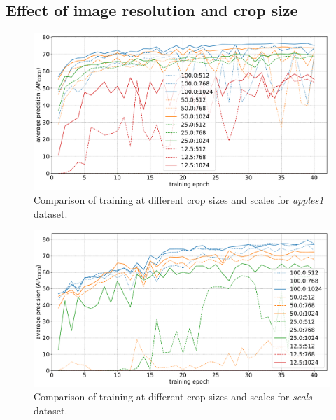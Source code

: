 \subsection {Effect of image resolution and crop size}
\label{sec:scale_crop}


\begin{figure}[h]
  \centering
  \includegraphics[width=1.0\linewidth]{charts/training/crops_scales/penguins.pdf}
  \caption{Comparison of training at different crop sizes and scales for \emph{apples1} dataset. }  
  \label{fig:apples_crop_scale}
\end{figure}

 
\begin{figure}[h]
  \centering
  \includegraphics[width=1.0\linewidth]{charts/training/crops_scales/seals.pdf}
  \caption{Comparison of training at different crop sizes and scales for \emph{seals} dataset. }  
  \label{fig:seals_crop_scale}
\end{figure}


